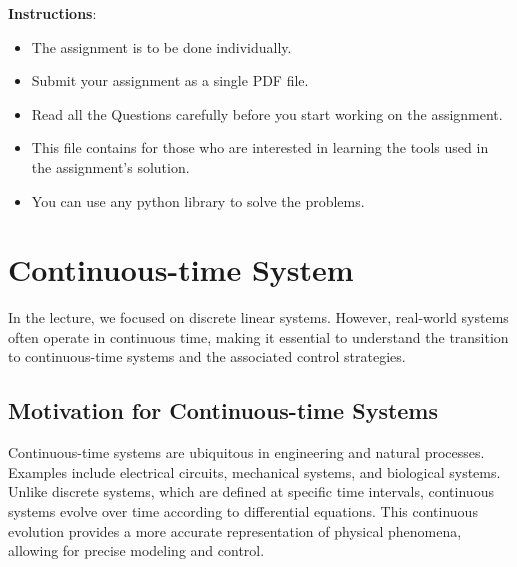 \documentclass[a4 paper]{article}
\begin{document}
\textbf{Instructions}: 
\begin{itemize}
    \item The assignment is to be done individually.
    \item Submit your assignment as a single PDF file.
    \item Read all the Questions carefully before you start working on the assignment.
    \item This file contains  for those who are interested in learning the tools used in the 
        assignment's solution. 
    \item You can use any python library to solve the problems.
\end{itemize}

\section{Continuous-time System}

In the lecture, we focused on discrete linear systems. However, real-world systems often operate in continuous time, 
making it essential to understand the transition to continuous-time systems and the associated control strategies.

\subsection{Motivation for Continuous-time Systems}
Continuous-time systems are ubiquitous in engineering and natural processes. Examples include electrical circuits, 
mechanical systems, and biological systems. Unlike discrete systems, which are defined at specific time intervals, 
continuous systems evolve over time according to differential equations. This continuous evolution provides a more 
accurate representation of physical phenomena, allowing for precise modeling and control.
\end{document}
